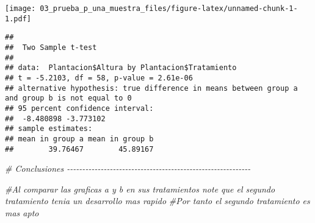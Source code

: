 \documentclass[
]{article}
\newenvironment{Shaded}{\begin{snugshade}}{\end{snugshade}}
\newcommand{\AttributeTok}[1]{\textcolor[rgb]{0.77,0.63,0.00}{#1}}
\newcommand{\CommentTok}[1]{\textcolor[rgb]{0.56,0.35,0.01}{\textit{#1}}}
\newcommand{\FunctionTok}[1]{\textcolor[rgb]{0.00,0.00,0.00}{#1}}
\newcommand{\NormalTok}[1]{#1}
\newcommand{\SpecialCharTok}[1]{\textcolor[rgb]{0.00,0.00,0.00}{#1}}
\begin{document}
\texttt{[image: 03\_prueba\_p\_una\_muestra\_files/figure-latex/unnamed-chunk-1-1.pdf]}

\begin{Shaded}
\end{Shaded}

\begin{verbatim}
## 
##  Two Sample t-test
## 
## data:  Plantacion$Altura by Plantacion$Tratamiento
## t = -5.2103, df = 58, p-value = 2.61e-06
## alternative hypothesis: true difference in means between group a and group b is not equal to 0
## 95 percent confidence interval:
##  -8.480898 -3.773102
## sample estimates:
## mean in group a mean in group b 
##        39.76467        45.89167
\end{verbatim}

\begin{Shaded}
\begin{Highlighting}[]
\CommentTok{\# Conclusiones {-}{-}{-}{-}{-}{-}{-}{-}{-}{-}{-}{-}{-}{-}{-}{-}{-}{-}{-}{-}{-}{-}{-}{-}{-}{-}{-}{-}{-}{-}{-}{-}{-}{-}{-}{-}{-}{-}{-}{-}{-}{-}{-}{-}{-}{-}{-}{-}{-}{-}{-}{-}{-}{-}{-}{-}{-}{-}{-}{-}}

\CommentTok{\#Al comparar las graficas a y b en sus tratamientos note que el segundo tratamiento tenia un desarrollo mas rapido}
\CommentTok{\#Por tanto el segundo tratamiento es mas apto }
\end{Highlighting}
\end{Shaded}
\end{document}
